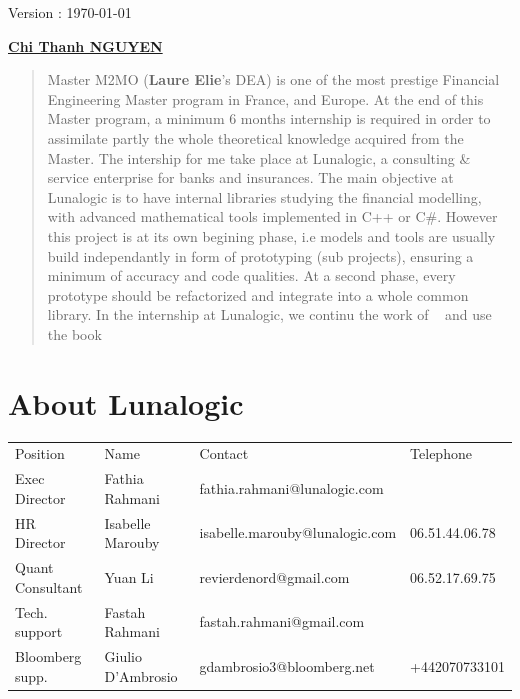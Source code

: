 \documentclass[a4paper,10pt]{article}
\begin{document}
\begin{titlepage}
\vspace{2cm}

\begin{center}
\end{center}
\begin{center}
\huge{ Version : \today }
\end{center}


\begin{center}
\href{mailto:chithanhnguyen.math@gmail.com}{\LARGE{\textbf{Chi Thanh NGUYEN}}}
\end{center}



\vfill
\begin{abstract}
Master M2MO (\textbf{Laure Elie}'s DEA) is one of the most prestige Financial Engineering Master program in France, and Europe. At the end of this Master program, a minimum 6 months internship is required in order to assimilate partly the whole theoretical knowledge acquired from the Master. The intership for me take place at Lunalogic, a consulting \& service enterprise for banks and insurances. The main objective at Lunalogic is to have internal libraries studying the financial modelling, with advanced mathematical tools implemented in C++ or C\#. However this project is at its own begining phase, i.e models and tools are usually build independantly in form of prototyping (sub projects), ensuring a minimum of accuracy and code qualities. At a second phase, every prototype should be refactorized and integrate into a whole common library. In the internship at Lunalogic, we continu the work of ~\cite{THAI2013} and use the book  ~\cite{BRIGO2006} ~\cite{BRIGO2005}
\end{abstract}
\end{titlepage}


\tableofcontents
\newpage

\newpage
\section{About Lunalogic}
\begin{tabular}{llll}
Position          &            Name              & Contact                        &Telephone      \\
Exec Director     & Fathia Rahmani               & fathia.rahmani@lunalogic.com   &               \\
HR   Director     & Isabelle Marouby             & isabelle.marouby@lunalogic.com &06.51.44.06.78 \\
Quant Consultant  & Yuan Li                      & revierdenord@gmail.com         &06.52.17.69.75 \\    
Tech. support     & Fastah Rahmani               & fastah.rahmani@gmail.com       &               \\ 
Bloomberg supp.   & Giulio D'Ambrosio            & gdambrosio3@bloomberg.net      &+442070733101  \\
\end{tabular}
\end{document}
